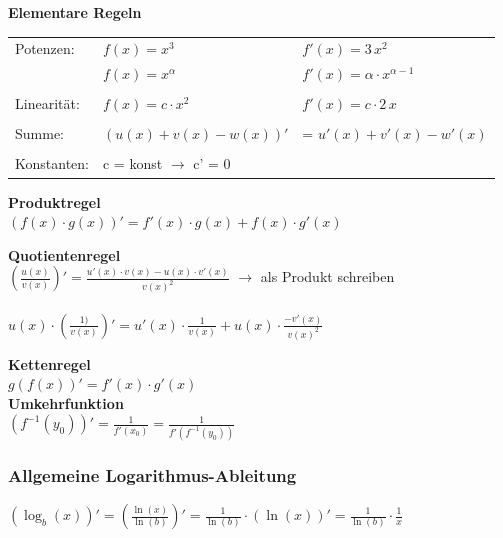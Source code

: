 			\textbf{Elementare Regeln}\\
			\begin{tabular}{lll}
			Potenzen: & $f(x) = x^3$ & $f'(x) = 3 \, x^2$ \\
			& $f(x) = x^\alpha$ & $f'(x) = \alpha \cdot x^{\alpha - 1}$ \\
			\\
			Linearität: & $f(x) = c \cdot x^2$ & $f'(x) = c \cdot 2 \, x $ \\
			\\
			Summe: & $(u(x) + v(x) - w(x))' $ & = $u'(x) + v'(x) - w'(x)$ \\
			\\
			Konstanten: & c = konst $\rightarrow$ c' = 0 \\
			\end{tabular}
			
			
			\textbf{Produktregel}\\
			$(f(x) \cdot g(x))' = f'(x) \cdot g(x) + f(x) \cdot g'(x)$ 
			
			\textbf{Quotientenregel}\\
			$\left( \frac{u(x)}{v(x)} \right) ' = \frac{u'(x) \cdot v(x) - u(x) \cdot v'(x)}{v(x) ^2}$ \quad $\rightarrow$ als Produkt schreiben \\
			\\
			$u(x) \cdot \left( \frac{1)}{v(x)} \right) ' =  u'(x) \cdot \frac{1}{v(x)} + u(x) \cdot \frac{- v'(x)}{v(x)^2}$
			
			\textbf{Kettenregel}\\
			$g(f(x))' =  f'(x) \cdot g'(x)$ \\
			
			\textbf{Umkehrfunktion}\\
			$(f^{-1}(y_0))' = \frac{1}{f'(x_0)} =  \frac{1}{f'(f^{-1}(y_0))}$ \\
			

			
			\subsubsection{Allgemeine Logarithmus-Ableitung}
			$(\log_b(x))' = \left( \frac{\ln(x)}{\ln(b)} \right)' = \frac{1}{\ln(b)} \cdot (\ln(x))' = \frac{1}{\ln(b)} \cdot \frac{1}{x} $
			
			
